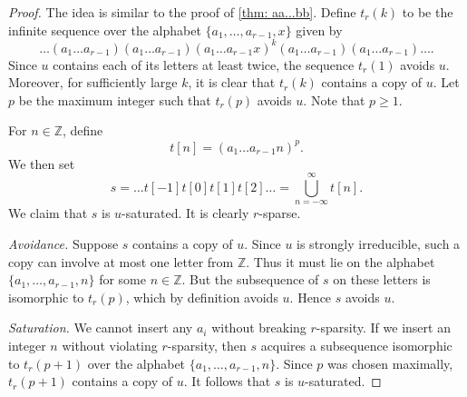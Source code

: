 \documentclass[10pt,a4paper]{amsart}
\begin{document}
\begin{proof}
    The idea is similar to the proof of \cref{thm: aa...bb}. Define $t_r(k)$ to be the infinite sequence over the alphabet $\{a_1,\dots, a_{r-1},x\}$ given by
    \[
    \dots (a_1\dots a_{r-1})(a_1\dots a_{r-1})(a_1\dots a_{r-1}x)^k (a_1\dots a_{r-1})(a_1\dots a_{r-1})\dots .
    \]
    Since $u$ contains each of its letters at least twice, the sequence $t_r(1)$ avoids $u$. Moreover, for sufficiently large $k$, it is clear that $t_r(k)$ contains a copy of $u$. Let $p$ be the maximum integer such that $t_r(p)$ avoids $u$. Note that $p\geq 1$.  
    
    For $n\in \mathbb Z$, define
    \[
    t[n] = (a_1\dots a_{r-1}n)^p.
    \]
    We then set
    \[
    s = \dots t[-1]t[0]t[1]t[2]\ldots = \bigcup_{n=-\infty}^\infty t[n].
    \]
    We claim that $s$ is $u$-saturated. It is clearly $r$-sparse.
    
    \smallskip \noindent\textit{Avoidance.} Suppose $s$ contains a copy of $u$. Since $u$ is strongly irreducible, such a copy can involve at most one letter from $\mathbb Z$. Thus it must lie on the alphabet $\{a_1,\dots, a_{r-1},n\}$ for some $n\in\mathbb Z$. But the subsequence of $s$ on these letters is isomorphic to $t_r(p)$, which by definition avoids $u$. Hence $s$ avoids $u$.
    
    \smallskip \noindent\textit{Saturation.} We cannot insert any $a_i$ without breaking $r$-sparsity. If we insert an integer $n$ without violating $r$-sparsity, then $s$ acquires a subsequence isomorphic to $t_r(p+1)$ over the alphabet $\{a_1,\dots, a_{r-1},n\}$. Since $p$ was chosen maximally, $t_r(p+1)$ contains a copy of $u$. It follows that $s$ is $u$-saturated.
\end{proof}
\end{document}
